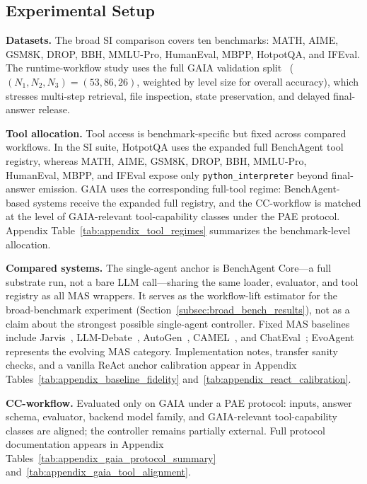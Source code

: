 \subsection{Experimental Setup}
\label{subsec:exp_setup}
\noindent\textbf{Datasets.}
The broad SI comparison covers ten benchmarks: MATH, AIME, GSM8K, DROP, BBH, MMLU-Pro, HumanEval, MBPP, HotpotQA, and IFEval.
The runtime-workflow study uses the full GAIA validation split~\citep{mialon2023gaia} ($(N_1,N_2,N_3)=(53,86,26)$, weighted by level size for overall accuracy), which stresses multi-step retrieval, file inspection, state preservation, and delayed final-answer release.

\noindent\textbf{Tool allocation.}
Tool access is benchmark-specific but fixed across compared workflows.
In the SI suite, HotpotQA uses the expanded full BenchAgent tool registry, whereas MATH, AIME, GSM8K, DROP, BBH, MMLU-Pro, HumanEval, MBPP, and IFEval expose only \texttt{python\_interpreter} beyond final-answer emission.
GAIA uses the corresponding full-tool regime: BenchAgent-based systems receive the expanded full registry, and the CC-workflow is matched at the level of GAIA-relevant tool-capability classes under the PAE protocol.
Appendix Table~\ref{tab:appendix_tool_regimes} summarizes the benchmark-level allocation.

\noindent\textbf{Compared systems.}
The single-agent anchor is BenchAgent Core---a full substrate run, not a bare LLM call---sharing the same loader, evaluator, and tool registry as all MAS wrappers.
It serves as the workflow-lift estimator for the broad-benchmark experiment (Section~\ref{subsec:broad_bench_results}), not as a claim about the strongest possible single-agent controller.
Fixed MAS baselines include Jarvis~\citep{shen2023hugginggpt}, LLM-Debate~\citep{du2023multiagentdebate}, AutoGen~\citep{wu2023autogen}, CAMEL~\citep{li2023camel}, and ChatEval~\citep{chan2023chateval}; EvoAgent~\citep{yuan2024evoagent} represents the evolving MAS category.
Implementation notes, transfer sanity checks, and a vanilla ReAct anchor calibration appear in Appendix Tables~\ref{tab:appendix_baseline_fidelity} and~\ref{tab:appendix_react_calibration}.

\noindent\textbf{CC-workflow.}
Evaluated only on GAIA under a PAE protocol: inputs, answer schema, evaluator, backend model family, and GAIA-relevant tool-capability classes are aligned; the controller remains partially external.
Full protocol documentation appears in Appendix Tables~\ref{tab:appendix_gaia_protocol_summary} and~\ref{tab:appendix_gaia_tool_alignment}.

